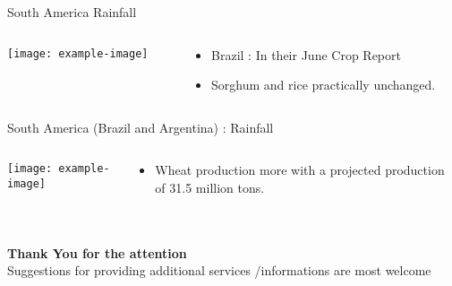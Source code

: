 \documentclass[handout,t]{beamer}
\begin{document}
    \begin{frame}{South America Rainfall }
    \begin{columns}[onlytextwidth,T]
        \begin{column}{.4\textwidth}
            \texttt{[image: example-image]}
        \end{column}
        \begin{column}{0.6\textwidth}
            \begin{itemize}
                \item\justifying Brazil : In their June Crop Report
                \item Sorghum and rice  practically unchanged.

            \end{itemize}
        \end{column}
    \end{columns}
\end{frame}



\begin{frame}{South America (Brazil and Argentina) : Rainfall}
\begin{columns}[onlytextwidth,T]
    \begin{column}{.4\textwidth}
        \texttt{[image: example-image]}
    \end{column}
    \begin{column}{0.6\textwidth}
        \begin{itemize}
            \item\justifying Wheat production  more with a projected production of 31.5 million tons. 

        \end{itemize}
    \end{column}
\end{columns}
\end{frame}


 \section{}
 \begin{frame}[c]
 \centering

 \textbf{\large Thank You for the attention}\\
   \vspace*{1cm}     
    Suggestions for providing additional services /informations are most welcome 

\end{frame}
\end{document}
